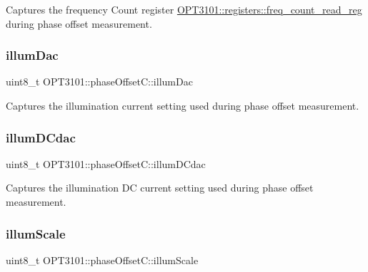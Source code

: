Captures the frequency Count register \mbox{\hyperlink{class_o_p_t3101_1_1registers_a0d343738560c0bc418f34b458735a811}{O\+P\+T3101\+::registers\+::freq\+\_\+count\+\_\+read\+\_\+reg}} during phase offset measurement. 

\mbox{\label{class_o_p_t3101_1_1phase_offset_c_a606c3c6697150e9f2672c7f7ad3d08ea}} 
\subsubsection{\texorpdfstring{illum\+Dac}{illumDac}}
{\footnotesize\ttfamily uint8\+\_\+t O\+P\+T3101\+::phase\+Offset\+C\+::illum\+Dac}



Captures the illumination current setting used during phase offset measurement. 

\mbox{\label{class_o_p_t3101_1_1phase_offset_c_a99bd3c6d218a562c98d2a842db48aaab}} 
\subsubsection{\texorpdfstring{illum\+D\+Cdac}{illumDCdac}}
{\footnotesize\ttfamily uint8\+\_\+t O\+P\+T3101\+::phase\+Offset\+C\+::illum\+D\+Cdac}



Captures the illumination DC current setting used during phase offset measurement. 

\mbox{\label{class_o_p_t3101_1_1phase_offset_c_a687116f5b495ca2314afd1b4cbc9bf34}} 
\subsubsection{\texorpdfstring{illum\+Scale}{illumScale}}
{\footnotesize\ttfamily uint8\+\_\+t O\+P\+T3101\+::phase\+Offset\+C\+::illum\+Scale}



